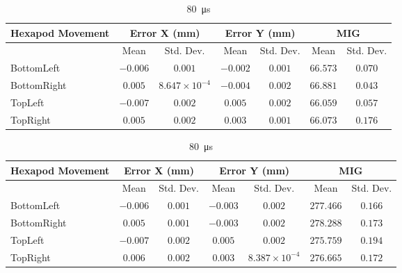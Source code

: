 \begin{table}[h]
    \centering
    \begin{subtable}{\textwidth}
        \centering
        \footnotesize
        \begin{tabular}{lcccccc}
            \toprule
            Hexapod Movement & \multicolumn{2}{c}{Error X (mm)} & \multicolumn{2}{c}{Error Y (mm)} & \multicolumn{2}{c}{MIG}  \\
            \midrule
            & \multicolumn{1}{c}{Mean} & \multicolumn{1}{c}{Std. Dev.} & \multicolumn{1}{c}{Mean} & \multicolumn{1}{c}{Std. Dev.} & \multicolumn{1}{c}{Mean} & \multicolumn{1}{c}{Std. Dev.} \\
            \midrule
            \textsf{BottomLeft} & $-0.006$ & $0.001$ & $-0.002$ & $0.001$ & $66.573$ & $0.070$ \\
            \textsf{BottomRight} & $0.005$ & $8.647\times10^{-4}$ & $-0.004$ & $0.002$ & $66.881$ & $0.043$ \\
            \textsf{TopLeft} & $-0.007$ & $0.002$ & $0.005$ & $0.002$ & $66.059$ & $0.057$ \\
            \textsf{TopRight} & $0.005$ & $0.002$ & $0.003$ & $0.001$ & $66.073$ & $0.176$ \\
            \bottomrule
        \end{tabular}
        \caption{\SI{20}{\micro\second}}
    \end{subtable}

    \vspace{10pt}

    \begin{subtable}{\textwidth}
        \centering
        \footnotesize
        \begin{tabular}{lcccccc}
            \toprule
            Hexapod Movement & \multicolumn{2}{c}{Error X (mm)} & \multicolumn{2}{c}{Error Y (mm)} & \multicolumn{2}{c}{MIG}  \\
            \midrule
            & \multicolumn{1}{c}{Mean} & \multicolumn{1}{c}{Std. Dev.} & \multicolumn{1}{c}{Mean} & \multicolumn{1}{c}{Std. Dev.} & \multicolumn{1}{c}{Mean} & \multicolumn{1}{c}{Std. Dev.} \\
            \midrule
            \textsf{BottomLeft} & $-0.006$ & $0.001$ & $-0.003$ & $0.002$ & $277.466$ & $0.166$ \\
            \textsf{BottomRight} & $0.005$ & $0.001$ & $-0.003$ & $0.002$ & $278.288$ & $0.173$ \\
            \textsf{TopLeft} & $-0.007$ & $0.002$ & $0.005$ & $0.002$ & $275.759$ & $0.194$ \\
            \textsf{TopRight} & $0.006$ & $0.002$ & $0.003$ & $8.387\times10^{-4}$ & $276.665$ & $0.172$ \\
            \bottomrule
        \end{tabular}
        \caption{\SI{80}{\micro\second}}
    \end{subtable}


\end{table}
